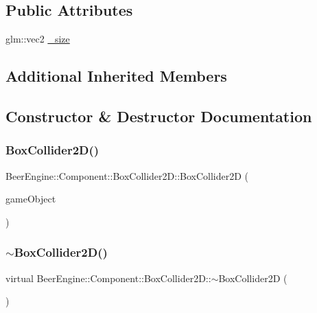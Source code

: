 \subsection*{Public Attributes}
\begin{DoxyCompactItemize}
\item 
glm\+::vec2 \mbox{\hyperlink{class_beer_engine_1_1_component_1_1_box_collider2_d_ae1472ec7f94fbd4d9cf3854d531f6988}{\+\_\+size}}
\end{DoxyCompactItemize}
\subsection*{Additional Inherited Members}


\subsection{Constructor \& Destructor Documentation}
\mbox{\label{class_beer_engine_1_1_component_1_1_box_collider2_d_a8b3e9562b1b4fdf9f6444b47c10ffa93}} 
\subsubsection{\texorpdfstring{Box\+Collider2\+D()}{BoxCollider2D()}}
{\footnotesize\ttfamily Beer\+Engine\+::\+Component\+::\+Box\+Collider2\+D\+::\+Box\+Collider2D (\begin{DoxyParamCaption}\item[{\mbox{\hyperlink{class_beer_engine_1_1_game_object}{Game\+Object}} $\ast$}]{game\+Object }\end{DoxyParamCaption})}

\mbox{\label{class_beer_engine_1_1_component_1_1_box_collider2_d_a56c4a94ddb75c8f455aacd79a2bed429}} 
\subsubsection{\texorpdfstring{$\sim$\+Box\+Collider2\+D()}{~BoxCollider2D()}}
{\footnotesize\ttfamily virtual Beer\+Engine\+::\+Component\+::\+Box\+Collider2\+D\+::$\sim$\+Box\+Collider2D (\begin{DoxyParamCaption}{ }\end{DoxyParamCaption})\hspace{0.3cm}{\ttfamily [virtual]}}



